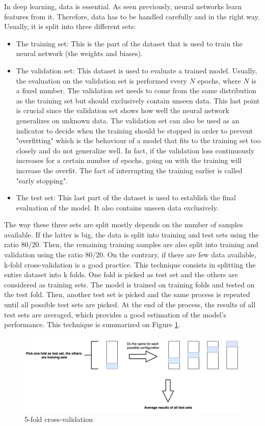 \setlength{\marginparwidth}{3cm}\leavevmode {}In deep learning, data is essential. As seen previously, neural networks learn features from it. Therefore, data has to be handled carefully and in the right way. Usually, it is split into three different sets:
\begin{itemize}
\item The training set: This is the part of the dataset that is used to train the neural network (the weights and biases).
\item The validation set: This dataset is used to evaluate a trained model. Usually, the evaluation on the validation set is performed every $N$ epochs, where $N$ is a fixed number. The validation set needs to come from the same distribution as the training set but should exclusively contain unseen data. This last point is crucial since the validation set shows how well the neural network generalizes on unknown data. The validation set can also be used as an indicator to decide when the training should be stopped in order to prevent "overfitting" which is the behaviour of a model that fits to the training set too closely and do not generalize well. In fact, if the validation loss continuously increases for a certain number of epochs, going on with the training will increase the overfit. The fact of interrupting the training earlier is called "early stopping".
\item The test set: This last part of the dataset is used to establish the final evaluation of the model. It also contains unseen data exclusively. 
\end{itemize}
The way these three sets are split mostly depends on the number of samples available. If the latter is big, the data is split into training and test sets using the ratio 80/20. Then, the remaining training samples are also split into training and validation using the ratio 80/20. On the contrary, if there are few data available, k-fold cross-validation is a good practice. This technique consists in splitting the entire dataset into k folds. One fold is picked as test set and the others are considered as training sets. The model is trained on training folds and tested on the test fold. Then, another test set is picked and the same process is repeated until all possible test sets are picked. At the end of the process, the results of all test sets are averaged, which provides a good estimation of the model's performance. This technique is summarized on Figure \ref{cross_validation}.

\begin{figure}[!h]
\centering
\includegraphics[width=1\textwidth, keepaspectratio=true]{./figures/cross_validation.png}
\caption{5-fold cross-validation}
\label{cross_validation}
\end{figure}


